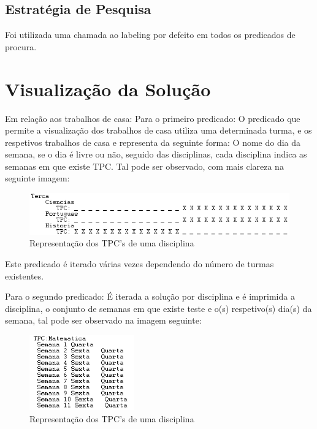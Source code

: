 \documentclass{llncs}
\begin{document}
\subsection{Estratégia de Pesquisa}

Foi utilizada uma chamada ao labeling por defeito em todos os predicados de procura.


\section{Visualização da Solução}
Em relação aos trabalhos de casa:
Para o primeiro predicado:
O predicado que permite a visualização dos trabalhos de casa utiliza uma determinada turma, e os respetivos trabalhos de casa e representa da seguinte forma:
O nome do dia da semana, se o dia é livre ou não, seguido das disciplinas, cada disciplina indica as semanas em que existe TPC. Tal pode ser observado, com mais clareza na seguinte imagem:

\begin{figure}
\centering
\includegraphics[width=1\textwidth]{tpc1}
\caption{Representação dos TPC's de uma disciplina}
\end{figure}
\FloatBarrier

Este predicado é iterado várias vezes dependendo do número de turmas existentes.

Para o segundo predicado:
É iterada a solução por disciplina e é imprimida a disciplina, o conjunto de semanas em que existe teste e o(s) respetivo(s) dia(s) da semana, tal pode ser observado na imagem seguinte:
\begin{figure}
\centering
\includegraphics[width=0.4\textwidth]{tpc2}
\caption{Representação dos TPC's de uma disciplina}
\end{figure}
\FloatBarrier
\end{document}
